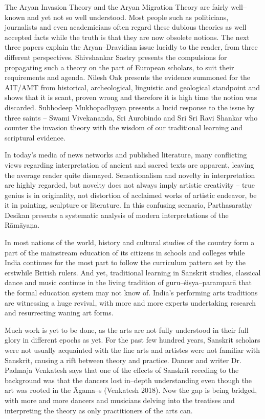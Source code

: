 The Aryan Invasion Theory and the Aryan Migration Theory are fairly well–known and yet not so well understood. Most people such as politicians, journalists and even academicians often regard these dubious theories as well accepted facts while the truth is that they are now obsolete notions. The next three papers explain the Aryan–Dravidian issue lucidly to the reader, from three different perspectives. Shivshankar Sastry presents the compulsions for propagating such a theory on the part of European scholars, to suit their requirements and agenda. Nilesh Oak presents the evidence summoned for the AIT/AMT from historical, archeological, linguistic and geological standpoint and shows that it is scant, proven wrong and therefore it is high time the notion was discarded. Subhodeep Mukhopadhyaya presents a lucid response to the issue by three saints – Swami Vivekananda, Sri Aurobindo and Sri Sri Ravi Shankar who counter the invasion theory with the wisdom of our traditional learning and scriptural evidence.

In today’s media of news networks and published literature, many conflicting views regarding interpretation of ancient and sacred texts are apparent, leaving the average reader quite dismayed. Sensationalism and novelty in interpretation are highly regarded, but novelty does not always imply artistic creativity – true genius is in originality, not distortion of acclaimed works of artistic endeavor, be it in painting, sculpture or literature. In this confusing scenario, Parthasarathy Desikan presents a systematic analysis of modern interpretations of the Rāmāyaņa.

In most nations of the world, history and cultural studies of the country form a part of the mainstream education of its citizens in schools and colleges while India continues for the most part to follow the curriculum pattern set by the erstwhile British rulers. And yet, traditional learning in Sanskrit studies, classical dance and music continue in the living tradition of guru–śiṣya–paramparā that the formal education system may not know of. India’s performing arts traditions are witnessing a huge revival, with more and more experts undertaking research and resurrecting waning art forms.

Much work is yet to be done, as the arts are not fully understood in their full glory in different epochs as yet. For the past few hundred years, Sanskrit scholars were not usually acquainted with the fine arts and artistes were not familiar with Sanskrit, causing a rift between theory and practice. Dancer and writer Dr. Padmaja Venkatesh says that one of the effects of Sanskrit receding to the background was that the dancers lost in–depth understanding even though the art was rooted in the Āgama–s (Venkatesh 2018). Now the gap is being bridged, with more and more dancers and musicians delving into the treatises and interpreting the theory as only practitioners of the arts can.


